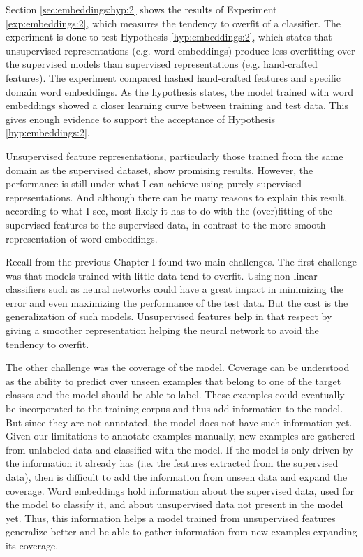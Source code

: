 Section \ref{sec:embeddings:hyp:2} shows the results of Experiment
\ref{exp:embeddings:2}, which measures the tendency to overfit of a
classifier. The experiment is done to test Hypothesis
\ref{hyp:embeddings:2}, which states that unsupervised representations
(e.g. word embeddings) produce less overfitting over the supervised models than
supervised representations (e.g. hand-crafted features). The experiment
compared hashed hand-crafted features and specific domain word embeddings. As
the hypothesis states, the model trained with word embeddings showed a closer
learning curve between training and test data. This gives enough evidence to
support the acceptance of Hypothesis \ref{hyp:embeddings:2}.

Unsupervised feature representations, particularly those trained from the same
domain as the supervised dataset, show promising results. However, the
performance is still under what I can achieve using purely supervised
representations. And although there can be many reasons to explain this result,
according to what I see, most likely it has to do with the (over)fitting of the
supervised features to the supervised data, in contrast to the more smooth
representation of word embeddings.

Recall from the previous Chapter I found two main challenges. The first
challenge was that models trained with little data tend to overfit. Using
non-linear classifiers such as neural networks could have a great impact in
minimizing the error and even maximizing the performance of the test data. But
the cost is the generalization of such models. Unsupervised features help in
that respect by giving a smoother representation helping the neural network to
avoid the tendency to overfit.

The other challenge was the coverage of the model. Coverage can be understood
as the ability to predict over unseen examples that belong to one of the target
classes and the model should be able to label. These examples could eventually
be incorporated to the training corpus and thus add information to the model.
But since they are not annotated, the model does not have such information yet.
Given our limitations to annotate examples manually, new examples are gathered
from unlabeled data and classified with the model. If the model is only driven
by the information it already has (i.e. the features extracted from the
supervised data), then is difficult to add the information from unseen data and
expand the coverage. Word embeddings hold information about the supervised
data, used for the model to classify it, and about unsupervised data not
present in the model yet. Thus, this information helps a model trained from
unsupervised features generalize better and be able to gather information from
new examples expanding its coverage.

